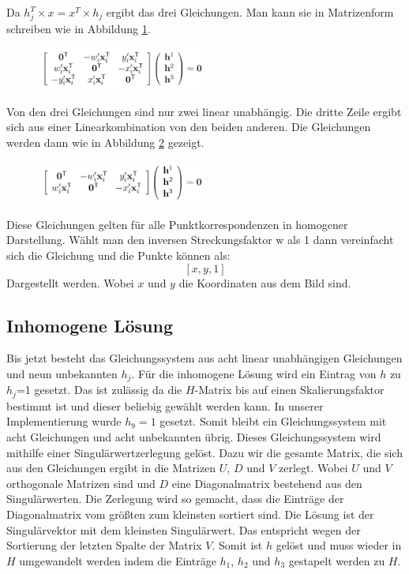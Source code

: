 Da $h_j^T\times x=x^T\times h_j$ ergibt das drei Gleichungen.  Man kann sie in Matrizenform schreiben wie in Abbildung \ref{img:41}.
 
\begin{figure}[ht]
    \centering
    \includegraphics[width=0.49\textwidth]{FiguresIS/41.jpg}
    \caption{\cite{Richard2000}}
     \label{img:41}
\end{figure}


Von den drei Gleichungen sind nur zwei linear unabhängig. Die dritte Zeile ergibt sich aus einer Linearkombination von den beiden anderen. Die Gleichungen werden dann wie in Abbildung \ref{img:43} gezeigt.

\begin{figure}[ht]
    \centering
    \includegraphics[width=0.49\textwidth]{FiguresIS/43.jpg}
    \caption{\cite{Richard2000}}
     \label{img:43}
\end{figure}

Diese Gleichungen gelten für alle Punktkorrespondenzen in homogener Darstellung. Wählt man den inversen Streckungsfaktor w als 1 dann vereinfacht sich die Gleichung und die Punkte können als:
			$$[x, y, 1]$$
Dargestellt werden. Wobei $x$ und $y$ die Koordinaten aus dem Bild sind.

\subsection{Inhomogene Lösung}
Bis jetzt besteht das Gleichungssystem aus acht linear unabhängigen Gleichungen und neun unbekannten $h_j$. Für die inhomogene Lösung wird ein Eintrag von $h$ zu $h_j$=1 gesetzt. Das ist zulässig da die $H$-Matrix bis auf einen Skalierungsfaktor bestimmt ist und dieser beliebig gewählt werden kann. In unserer Implementierung wurde $h_9=1$ gesetzt. Somit bleibt ein Gleichungssystem mit acht Gleichungen und acht unbekannten übrig.
Dieses Gleichungssystem wird mithilfe einer Singulärwertzerlegung gelöst. Dazu wir die gesamte Matrix, die sich aus den Gleichungen ergibt in die Matrizen $U$, $D$ und $V$ zerlegt. Wobei $U$ und $V$ orthogonale Matrizen sind und $D$ eine Diagonalmatrix bestehend aus den Singulärwerten. Die Zerlegung wird so gemacht, dass die Einträge der Diagonalmatrix vom größten zum kleinsten sortiert sind. Die Lösung ist der Singulärvektor mit dem kleinsten Singulärwert. Das entspricht wegen der Sortierung der letzten Spalte der Matrix $V$. Somit ist $h$ gelöst und muss wieder in $H$ umgewandelt werden indem die Einträge $h_1$, $h_2$ und $h_3$ gestapelt werden zu $H$.

